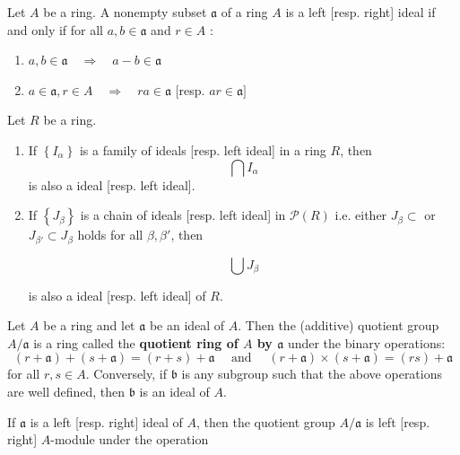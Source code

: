 \begin{theorem}
    Let $A$ be a ring.
    A nonempty subset $\mathfrak{a}$ of a ring $A$ is a left [resp. right] ideal if and only if for all $a,{b} \in {\mathfrak{a}}$ and ${r} \in A$ :
    \begin{enumerate}[label=(\roman*)]
        \item
              $a, {b} \in {\mathfrak{a}} \quad \Rightarrow \quad a-{b} \in {\mathfrak{a}}$
        \item
              $a \in {\mathfrak{a}}, {r} \in {A} \quad \Rightarrow \quad {ra} \in {\mathfrak{a}}$
              $[$resp. ${ar} \in {\mathfrak{a}}$$]$
    \end{enumerate}
\end{theorem}

\begin{corollary}
    \label{cor: ideal}
    Let $R$ be a ring.
    \begin{enumerate}
        \item If $\left\{I_\alpha \right\}$ is a family of ideals [resp. left ideal] in a ring $R$, then
              \begin{equation*}
                  \bigcap I_\alpha
              \end{equation*}
              is also a ideal [resp. left ideal].

        \item If $\left\{J_\beta\right\}$ is a chain of ideals [resp. left ideal] in $\mathcal{P}(R)$ i.e. either $J_\beta \subset$ or $J_{\beta'} \subset J_\beta$ holds for all $\beta,\beta'$, then

              \begin{equation*}
                  \bigcup J_\beta
              \end{equation*}

              is also a ideal [resp. left ideal] of $R$.
    \end{enumerate}
\end{corollary}

\begin{definition}
    Let $A$ be a ring and let $\mathfrak{a}$ be an ideal of $A$. Then the (additive) quotient group $A / \mathfrak{a}$ is a ring called the \textbf{quotient ring of $A$ by $\mathfrak{a}$} under the binary operations:
    \begin{equation*}
        (r+\mathfrak{a})+(s+\mathfrak{a})=(r+s)+\mathfrak{a} \quad \text { and } \quad(r+\mathfrak{a}) \times(s+\mathfrak{a})=(r s)+\mathfrak{a}
    \end{equation*}
    for all $r, s \in A$.
    Conversely, if $\mathfrak{b}$ is any subgroup such that the above operations are well defined, then $\mathfrak{b}$ is an ideal of $A$.
    \begin{remark}
        If $\mathfrak{a}$ is a left [resp. right] ideal of $A$, then the quotient group $A / \mathfrak{a}$ is left [resp. right] $A$-module under the operation
    \end{remark}
\end{definition}


